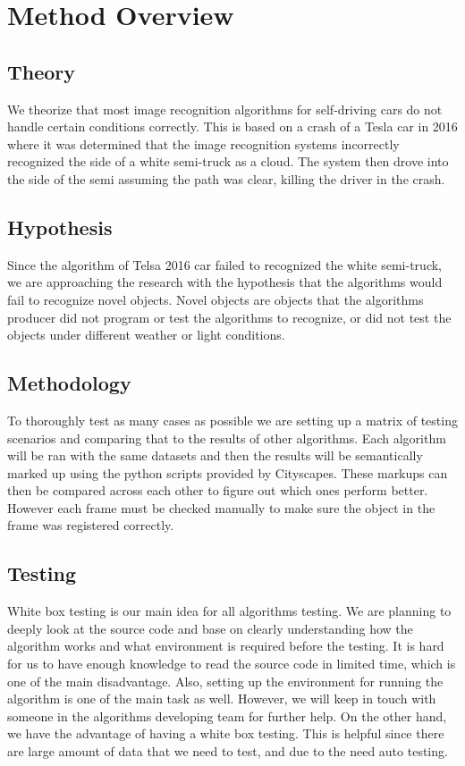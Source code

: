 \section{Method Overview}

\subsection{Theory}
We theorize that most image recognition algorithms for self-driving cars do not handle certain conditions correctly.
This is based on a crash of a Tesla car in 2016 where it was determined that the image recognition systems incorrectly recognized the side of a white semi-truck as a cloud.
The system then drove into the side of the semi assuming the path was clear, killing the driver in the crash.

\subsection{Hypothesis}
Since the algorithm of Telsa 2016 car failed to recognized the white semi-truck, we are approaching the research with the hypothesis that the algorithms would fail to recognize novel objects. Novel objects are objects that the algorithms producer did not program or test the algorithms to recognize, or did not test the objects under different weather or light conditions. 


\subsection{Methodology}    
To thoroughly test as many cases as possible we are setting up a matrix of testing scenarios and comparing that to the results of other algorithms. 
Each algorithm will be ran with the same datasets and then the results will be semantically marked up using the python scripts provided by Cityscapes. 
These markups can then be compared across each other to figure out which ones perform better.
However each frame must be checked manually to make sure the object in the frame was registered correctly. 

\subsection{Testing}
White box testing is our main idea for all algorithms testing. 
We are planning to deeply look at the source code and base on clearly understanding how the algorithm works and what environment is required before the testing. 
It is hard for us to have enough knowledge to read the source code in limited time, which is one of the main disadvantage.
Also, setting up the environment for running the algorithm is one of the main task as well.
However, we will keep in touch with someone in the algorithms developing team for further help. 
On the other hand, we have the advantage of having a white box testing. 
This is helpful since there are large amount of data that we need to test, and due to the need auto testing. 

